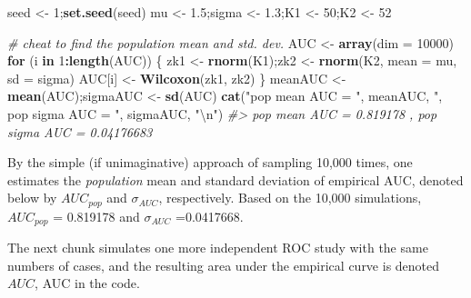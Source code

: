 \documentclass[
]{book}
\newenvironment{Shaded}{\begin{snugshade}}{\end{snugshade}}
\newcommand{\CharTok}[1]{\textcolor[rgb]{0.31,0.60,0.02}{#1}}
\newcommand{\CommentTok}[1]{\textcolor[rgb]{0.56,0.35,0.01}{\textit{#1}}}
\newcommand{\ControlFlowTok}[1]{\textcolor[rgb]{0.13,0.29,0.53}{\textbf{#1}}}
\newcommand{\DataTypeTok}[1]{\textcolor[rgb]{0.13,0.29,0.53}{#1}}
\newcommand{\DecValTok}[1]{\textcolor[rgb]{0.00,0.00,0.81}{#1}}
\newcommand{\FloatTok}[1]{\textcolor[rgb]{0.00,0.00,0.81}{#1}}
\newcommand{\KeywordTok}[1]{\textcolor[rgb]{0.13,0.29,0.53}{\textbf{#1}}}
\newcommand{\NormalTok}[1]{#1}
\newcommand{\OperatorTok}[1]{\textcolor[rgb]{0.81,0.36,0.00}{\textbf{#1}}}
\newcommand{\StringTok}[1]{\textcolor[rgb]{0.31,0.60,0.02}{#1}}
\begin{document}
\begin{Shaded}
\begin{Highlighting}[]
\NormalTok{seed \textless{}{-}}\StringTok{ }\DecValTok{1}\NormalTok{;}\KeywordTok{set.seed}\NormalTok{(seed)}
\NormalTok{mu \textless{}{-}}\StringTok{ }\FloatTok{1.5}\NormalTok{;sigma \textless{}{-}}\StringTok{ }\FloatTok{1.3}\NormalTok{;K1 \textless{}{-}}\StringTok{ }\DecValTok{50}\NormalTok{;K2 \textless{}{-}}\StringTok{ }\DecValTok{52}

\CommentTok{\# cheat to find the population mean and std. dev.}
\NormalTok{AUC \textless{}{-}}\StringTok{ }\KeywordTok{array}\NormalTok{(}\DataTypeTok{dim =} \DecValTok{10000}\NormalTok{)}
\ControlFlowTok{for}\NormalTok{ (i }\ControlFlowTok{in} \DecValTok{1}\OperatorTok{:}\KeywordTok{length}\NormalTok{(AUC)) \{}
\NormalTok{  zk1 \textless{}{-}}\StringTok{ }\KeywordTok{rnorm}\NormalTok{(K1);zk2 \textless{}{-}}\StringTok{ }\KeywordTok{rnorm}\NormalTok{(K2, }\DataTypeTok{mean =}\NormalTok{ mu, }\DataTypeTok{sd =}\NormalTok{ sigma)  }
\NormalTok{  AUC[i] \textless{}{-}}\StringTok{ }\KeywordTok{Wilcoxon}\NormalTok{(zk1, zk2)}
\NormalTok{\}}
\NormalTok{meanAUC   \textless{}{-}}\StringTok{  }\KeywordTok{mean}\NormalTok{(AUC);sigmaAUC  \textless{}{-}}\StringTok{  }\KeywordTok{sd}\NormalTok{(AUC)}
\KeywordTok{cat}\NormalTok{(}\StringTok{"pop mean AUC = "}\NormalTok{, meanAUC, }\StringTok{", pop sigma AUC = "}\NormalTok{, sigmaAUC, }\StringTok{"}\CharTok{\textbackslash{}n}\StringTok{"}\NormalTok{)}
\CommentTok{\#\textgreater{} pop mean AUC =  0.819178 , pop sigma AUC =  0.04176683}
\end{Highlighting}
\end{Shaded}

By the simple (if unimaginative) approach of sampling 10,000 times, one estimates the \emph{population} mean and standard deviation of empirical AUC, denoted below by \(AUC_{pop}\) and \(\sigma_{AUC}\), respectively. Based on the 10,000 simulations, \(AUC_{pop}\) = 0.819178 and \(\sigma_{AUC}\) =0.0417668.

The next chunk simulates one more independent ROC study with the same numbers of cases, and the resulting area under the empirical curve is denoted \(AUC\), AUC in the code.
\end{document}
